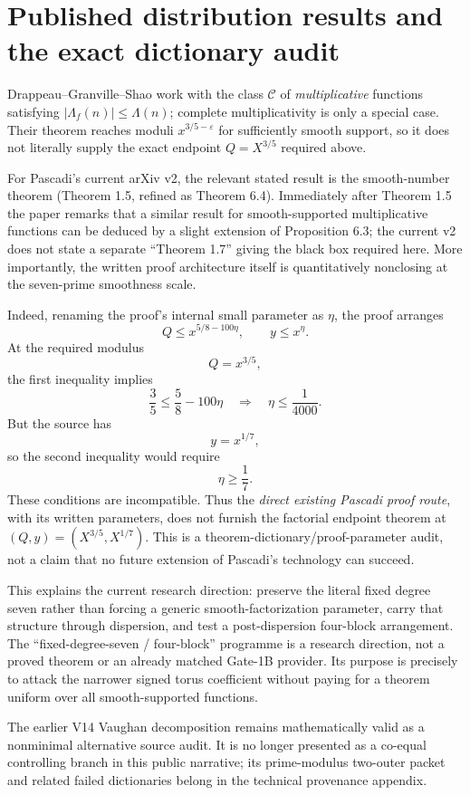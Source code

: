 \documentclass[11pt]{article}
\theoremstyle{definition}
\newcommand{\1}{\mathbf 1}
\begin{document}
{{{\section{Published distribution results and the exact dictionary audit}

Drappeau--Granville--Shao work with the class $\mathcal C$ of
\emph{multiplicative} functions satisfying
$|\Lambda_f(n)|\le\Lambda(n)$; complete multiplicativity is only a special case.
Their theorem reaches moduli $x^{3/5-\varepsilon}$ for sufficiently smooth support, so it
does not literally supply the exact endpoint $Q=X^{3/5}$ required above.

For Pascadi's current arXiv v2, the relevant stated result is the smooth-number theorem
(Theorem 1.5, refined as Theorem 6.4).  Immediately after Theorem 1.5 the paper remarks
that a similar result for smooth-supported multiplicative functions can be deduced by a
slight extension of Proposition 6.3; the current v2 does not state a separate
``Theorem 1.7'' giving the black box required here.  More importantly, the written proof
architecture itself is quantitatively nonclosing at the seven-prime smoothness scale.

Indeed, renaming the proof's internal small parameter as $\eta$, the proof arranges
\[
Q\le x^{5/8-100\eta},\qquad y\le x^\eta.
\]
At the required modulus
\[
Q=x^{3/5},
\]
the first inequality implies
\[
\frac35\le\frac58-100\eta
\quad\Longrightarrow\quad
\boxed{\eta\le\frac1{4000}}.
\]
But the source has
\[
y=x^{1/7},
\]
so the second inequality would require
\[
\boxed{\eta\ge\frac17}.
\]
These conditions are incompatible.  Thus the \emph{direct existing Pascadi proof route},
with its written parameters, does not furnish the factorial endpoint theorem at
$(Q,y)=(X^{3/5},X^{1/7})$.  This is a theorem-dictionary/proof-parameter audit, not a
claim that no future extension of Pascadi's technology can succeed.

This explains the current research direction: preserve the literal fixed degree seven rather than forcing a
generic smooth-factorization parameter, carry that structure through dispersion, and test a post-dispersion
four-block arrangement.  The ``fixed-degree-seven / four-block'' programme is a research direction, not a
proved theorem or an already matched Gate-1B provider.  Its purpose is precisely to attack the narrower signed
torus coefficient without paying for a theorem uniform over all smooth-supported functions.

The earlier V14 Vaughan decomposition remains mathematically valid as a nonminimal
alternative source audit.  It is no longer presented as a co-equal controlling branch in
this public narrative; its prime-modulus two-outer packet and related failed dictionaries
belong in the technical provenance appendix.

}}}
\end{document}
